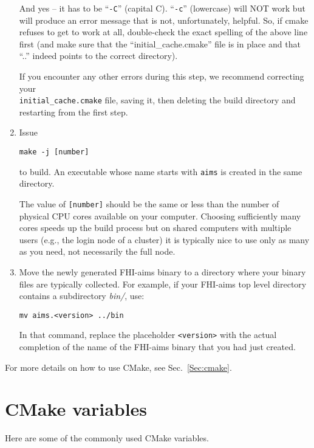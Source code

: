 \begin{enumerate}
And yes -- it has to be ``\texttt{-C}'' (capital C). ``\texttt{-c}'' (lowercase)
will NOT work but will produce an error message that is not, unfortunately, helpful.
So, if cmake refuses to get to work at all, double-check the exact
spelling of the above line first (and make sure that
the ``initial\_cache.cmake'' file is in place and that ``..''
indeed points to the correct directory).

If you encounter any other errors during this step, we recommend correcting
your \\ \texttt{initial\_cache.cmake} file, saving it, then deleting
the build directory and restarting from the first step.
\item Issue
\begin{verbatim}
make -j [number]
\end{verbatim}
to build. An executable whose name starts with \texttt{aims} is
created in the same directory.

The value of \texttt{[number]} should
be the same or less than the number of physical CPU cores available on
your computer. Choosing sufficiently many cores speeds up the build
process but on shared computers with multiple users (e.g., the
login node of a cluster) it is typically nice to use only as many as
you need, not necessarily the full node.
\item Move the newly generated FHI-aims binary to a directory where
  your binary files are typically collected. For example, if your
  FHI-aims top level directory contains a subdirectory \emph{bin/}, use:
  \begin{verbatim}
mv aims.<version> ../bin
\end{verbatim}
  In that command, replace the placeholder \texttt{<version>} with the
  actual completion of the name of the FHI-aims binary that you had
  just created.
\end{enumerate}
For more details on how to use CMake, see Sec.~\ref{Sec:cmake}.

\section{CMake variables}
\label{Sec:cmake-variables}

Here are some of the commonly used CMake variables.

